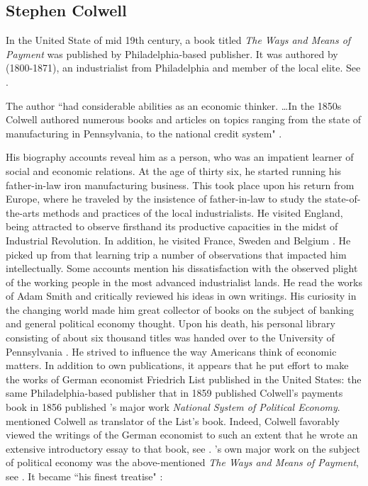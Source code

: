 %
%
\subsection{Stephen Colwell}

In the United State of mid 19th century, a book titled \textit{The Ways and Means of Payment} was published by Philadelphia-based publisher. It was authored by \citeauthor{colwell1859} (1800-1871), an industrialist from Philadelphia and member of the local elite. See \citep{colwell1859}. 

The author ``had considerable abilities as an economic thinker. \dots  In the 1850s Colwell authored numerous books and articles on topics ranging from the state of manufacturing in Pennsylvania, to the national credit system" \citep[chapter~8, pp.~109-121]{davenport}. 

His biography accounts reveal him as a person, who was an impatient learner of social and economic relations. At the age of thirty six, he started running his father-in-law iron manufacturing business. This took place upon his return from Europe, where he traveled by the insistence of father-in-law to study the state-of-the-arts methods and practices of the local industrialists. He visited England, being attracted to observe firsthand its productive capacities in the midst of Industrial Revolution. In addition, he visited France, Sweden and Belgium \citep[footnote 3, p.~235]{davenport}. He picked up from that learning trip a number of observations that impacted him intellectually. Some accounts mention his dissatisfaction with the observed plight of the working people in the most advanced industrialist lands. He read the works of Adam Smith and critically reviewed his ideas in own writings. His curiosity in the changing world made him great collector of books on the subject of banking and general political economy thought. Upon his death, his personal library consisting of about six thousand titles was handed over to the University of Pennsylvania \citeyearpar[p.~110]{davenport}. He strived to influence the way Americans think of economic matters. In addition to own publications, it appears that he put effort to make the works of German economist Friedrich List published in the United States: the same Philadelphia-based publisher that in 1859 published Colwell's payments book in 1856 published \citeauthor{flist1856}'s major work \textit{National System of Political Economy}. \cite[footnote 12, p.~380]{breton1964} mentioned Colwell as translator of the List's book. Indeed, Colwell favorably viewed the writings of the German economist to such an extent that he wrote an extensive introductory essay to that book, see \citep{colwell1856}. \citeauthor{colwell1859}'s own major work on the subject of political economy was the above-mentioned \textit{The Ways and Means of Payment}, see \citeyearpar{colwell1859}. It became ``his finest treatise" \citep[p.~819]{dorfman2}:    

